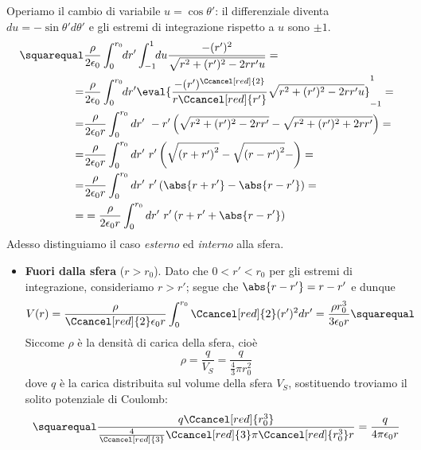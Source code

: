 \begin{examplewt}
	Operiamo il cambio di variabile $u=\cos\theta'$: il differenziale diventa $du=-\sin\theta'd\theta'$ e gli estremi di integrazione rispetto a $u$ sono $\pm 1$.
	\begin{align*}
		\squarequal&\frac{\rho}{2\epsilon_0}\int^{r_0}_0 \negthickspace dr'\int^1_{-1}\negthickspace du \frac{-(r')^2}{\sqrt{r^2+(r')^2-2rr'u}}=\\
		=&\frac{\rho}{2\epsilon_0}\int^{r_0}_0 \negthickspace dr' \eval{\frac{-(r')^{\Ccancel[red]{2}}}{r\Ccancel[red]{r'}} \sqrt{r^2+(r')^2-2rr'u}}^1_{-1}=\\
		=&\frac{\rho}{2\epsilon_0r}\int^{r_0}_0 dr'\ -r'\left(\sqrt{r^2+(r')^2-2rr'}-\sqrt{r^2+(r')^2+2rr'}\right)=\\
		=&\frac{\rho}{2\epsilon_0r}\int^{r_0}_0 dr'\ r'\left(\sqrt{\left(r+r'\right)^2}-\sqrt{\left(r-r'\right)^2}-\right)=\\
		=&\frac{\rho}{2\epsilon_0r}\int^{r_0}_0 dr'\ r'\left(\abs{r+r'}-\abs{r-r'}\right)=\\
		=&=\frac{\rho}{2\epsilon_0r}\int^{r_0}_0 dr'\ r'\left( r+r' + \abs{r-r'} \right)
	\end{align*}
	Adesso distinguiamo il caso \textit{esterno} ed \textit{interno} alla sfera.
	\begin{itemize}
		\item \textbf{Fuori dalla sfera} ($r>r_0$). Dato che $0<r'<r_0$ per gli estremi di integrazione, consideriamo $r>r'$; segue che $\abs{r-r'}=r-r'$ e dunque
		\begin{equation*}
			V(r)=\frac{\rho}{\Ccancel[red]{2}\epsilon_0 r}\int^{r_0}_0 \Ccancel[red]{2} (r')^2 dr'= \frac{\rho r_0^3}{3\epsilon_0 r}\squarequal
		\end{equation*}
		Siccome $\rho$ è la densità di carica della sfera, cioè
		\begin{equation*}
			\rho=\frac{q}{V_S}=\frac{q}{\frac{4}{3} \pi r_0^2}
		\end{equation*}
		dove $q$ è la carica distribuita sul volume della sfera $V_S$, sostituendo troviamo il solito potenziale di Coulomb:
		\begin{equation*}
			\squarequal\frac{q\Ccancel[red]{r_0^3}}{\frac{4}{\Ccancel[red]{3}}\Ccancel[red]{3}\pi \Ccancel[red]{r_0^3} r}=\frac{q}{4\pi \epsilon_0 r}
		\end{equation*}
		\begin{equation}

\end{equation}
\end{itemize}
\end{examplewt}
